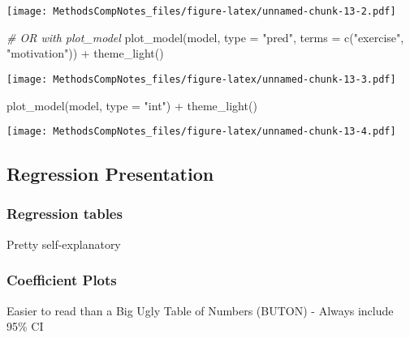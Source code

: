 \documentclass[
]{article}
\newenvironment{Shaded}{\begin{snugshade}}{\end{snugshade}}
\newcommand{\AttributeTok}[1]{\textcolor[rgb]{0.77,0.63,0.00}{#1}}
\newcommand{\CommentTok}[1]{\textcolor[rgb]{0.56,0.35,0.01}{\textit{#1}}}
\newcommand{\FunctionTok}[1]{\textcolor[rgb]{0.00,0.00,0.00}{#1}}
\newcommand{\NormalTok}[1]{#1}
\newcommand{\SpecialCharTok}[1]{\textcolor[rgb]{0.00,0.00,0.00}{#1}}
\newcommand{\StringTok}[1]{\textcolor[rgb]{0.31,0.60,0.02}{#1}}
\begin{document}
\texttt{[image: MethodsCompNotes\_files/figure-latex/unnamed-chunk-13-2.pdf]}

\begin{Shaded}
\begin{Highlighting}[]
\CommentTok{\# OR with plot\_model}
\FunctionTok{plot\_model}\NormalTok{(model, }\AttributeTok{type =} \StringTok{"pred"}\NormalTok{, }\AttributeTok{terms =} \FunctionTok{c}\NormalTok{(}\StringTok{"exercise"}\NormalTok{, }\StringTok{"motivation"}\NormalTok{)) }\SpecialCharTok{+}
  \FunctionTok{theme\_light}\NormalTok{()}
\end{Highlighting}
\end{Shaded}

\texttt{[image: MethodsCompNotes\_files/figure-latex/unnamed-chunk-13-3.pdf]}

\begin{Shaded}
\begin{Highlighting}[]
\FunctionTok{plot\_model}\NormalTok{(model, }\AttributeTok{type =} \StringTok{"int"}\NormalTok{) }\SpecialCharTok{+}
  \FunctionTok{theme\_light}\NormalTok{()}
\end{Highlighting}
\end{Shaded}

\texttt{[image: MethodsCompNotes\_files/figure-latex/unnamed-chunk-13-4.pdf]}

\hypertarget{regression-presentation}{%
\subsection{Regression Presentation}\label{regression-presentation}}

\hypertarget{regression-tables}{%
\subsubsection{Regression tables}\label{regression-tables}}

Pretty self-explanatory

\hypertarget{coefficient-plots}{%
\subsubsection{Coefficient Plots}\label{coefficient-plots}}

Easier to read than a Big Ugly Table of Numbers (BUTON) - Always include
95\% CI
\end{document}
